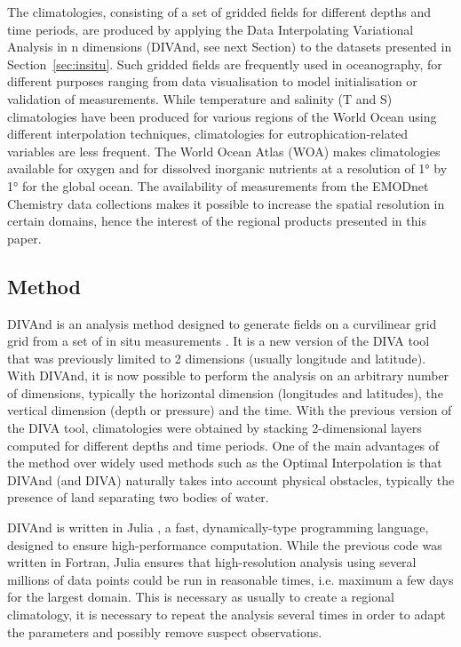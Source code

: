 \documentclass[essd, manuscript]{copernicus}
\begin{document}
The climatologies, consisting of a set of gridded fields for different depths and time periods, are produced by applying the Data Interpolating Variational Analysis in n dimensions (DIVAnd, see next Section) to the datasets presented in Section~\ref{sec:insitu}. Such gridded fields are frequently used in oceanography, for different purposes ranging from data visualisation to model initialisation or validation of measurements.  
While temperature and salinity (T and S) climatologies have been produced for various regions of the World Ocean using different interpolation techniques, climatologies for eutrophication-related variables are less frequent. The World Ocean Atlas (WOA) makes climatologies available for oxygen \citep[Dissolved Oxygen, Apparent Oxygen Utilization, and Oxygen Saturation][]{Garcia2024} and for dissolved inorganic nutrients \citep[phosphate, nitrate and nitrate+nitrite, silicate][]{Garcia2024b} at a resolution of 1° by 1° for the global ocean. The availability of measurements from the EMODnet Chemistry data collections makes it  possible to increase the spatial resolution in certain domains, hence the interest of the regional products presented in this paper.


\subsection{Method}

DIVAnd is an analysis method designed to generate fields on a curvilinear grid grid from a set of in situ measurements \citep{BARTH2014}. It is a new version of the DIVA tool \citep{TROUPIN2012,BECKERS2014} that was previously limited to 2 dimensions (usually longitude and latitude). With DIVAnd, it is now possible to perform the analysis on an arbitrary number of dimensions, typically the horizontal dimension (longitudes and latitudes), the vertical dimension (depth or pressure) and the time. With the previous version of  the DIVA tool, climatologies were obtained by stacking 2-dimensional layers computed for different depths and time periods. 
One of the main advantages of the method over widely used methods such as the Optimal Interpolation \citep[OI,][]{GANDIN1966,BRETHERTON1976} is that DIVAnd (and DIVA) naturally takes into account physical obstacles, typically the presence of land separating two bodies of water.  

DIVAnd is written in Julia \citep{Bezanson2017}, a fast, dynamically-type programming language, designed to ensure high-performance computation. While the previous code was written in Fortran, Julia ensures that high-resolution analysis using several millions of data points could be run in reasonable times, i.e. maximum a few days for the largest domain. This is necessary as usually to create a regional climatology, it is necessary to repeat the analysis several times in order to adapt the parameters and possibly remove suspect observations.
\end{document}
